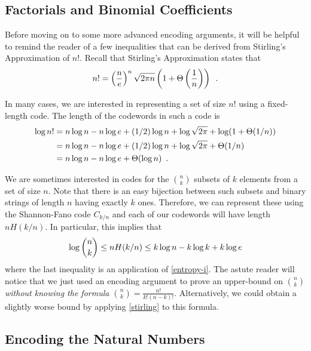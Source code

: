\documentclass{patmorin}
\begin{document}
\subsection{Factorials and Binomial Coefficients}

Before moving on to some more advanced encoding arguments, it will be
helpful to remind the reader of a few inequalities that can be derived
from Stirling's Approximation of $n!$.  Recall that Stirling's
Approximation states that
\begin{equation}
  n! = \left(\frac{n}{e}\right)^n\sqrt{2\pi n}\left(1+\Theta\left(\frac{1}{n}\right)\right) \enspace .
  \eqlabel{stirling}
\end{equation}

In many cases, we are interested in representing a set of size $n!$
using a fixed-length code.  The length of the codewords in such a code
is
\begin{align}
  \log n!
  & = n\log n - n\log e + (1/2)\log n + \log \sqrt{2 \pi} + \log(1+\Theta(1/n)) \notag \\
  & = n\log n - n\log e + (1/2)\log n + \log \sqrt{2 \pi} + \Theta(1/n) \notag \\
  & = n\log n - n\log e + \Theta(\log n) \eqlabel{stirling-loose}
    \enspace .
\end{align}

We are sometimes interested in codes for the $\binom{n}{k}$ subsets of
$k$ elements from a set of size $n$. Note that there is an easy
bijection between such subsets and binary strings of length $n$ having
exactly $k$ ones. Therefore, we can represent these using the
Shannon-Fano code $C_{k/n}$ and each of our codewords will have length
$nH(k/n)$.  In particular, this implies that
\begin{equation}
  \log\binom{n}{k} \le nH(k/n) \le k\log n - k\log k + k\log e 
  \eqlabel{log-n-choose-k}
\end{equation}
where the last inequality is an application of \eqref{entropy-i}. The
astute reader will notice that we just used an encoding argument to
prove an upper-bound on $\binom{n}{k}$ \emph{without knowing the formula $\binom{n}{k}=\frac{n!}{k! (n - k)!}$}. Alternatively, we could obtain
a slightly worse bound by applying 
\eqref{stirling} to this formula.

\subsection{Encoding the Natural Numbers}
\end{document}
